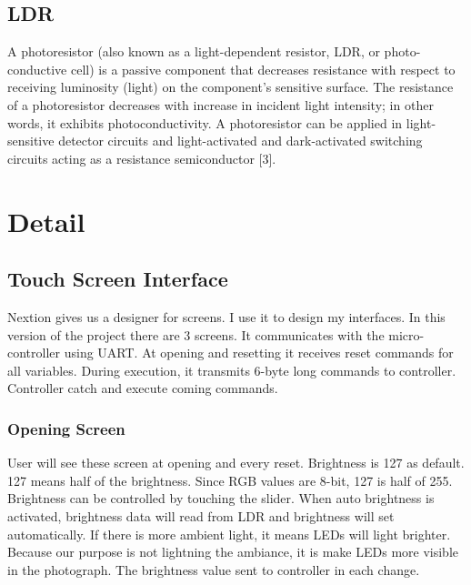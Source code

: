 \documentclass[conference]{IEEEtran}
\begin{document}
\subsection{LDR}
A photoresistor (also known as a light-dependent resistor, LDR, or photo-conductive cell) is a passive component that decreases resistance with respect to receiving luminosity (light) on the component's sensitive surface. The resistance of a photoresistor decreases with increase in incident light intensity; in other words, it exhibits photoconductivity. A photoresistor can be applied in light-sensitive detector circuits and light-activated and dark-activated switching circuits acting as a resistance semiconductor [3]. \\

\section{Detail}

\subsection{Touch Screen Interface}
Nextion gives us a designer for screens. I use it to design my interfaces. In this version of the project there are 3 screens. It communicates with the micro-controller using UART. At opening and resetting it receives reset commands for all variables. During execution, it transmits 6-byte long commands to controller. Controller catch and execute coming commands.

\subsubsection{Opening Screen}
User will see these screen at opening and every reset. Brightness is 127 as default. 127 means half of the brightness. Since RGB values are 8-bit, 127 is half of 255. Brightness can be controlled by touching the slider. When auto brightness is activated, brightness data will read from LDR and brightness will set automatically. If there is more ambient light, it means LEDs will light brighter. Because our purpose is not lightning the ambiance, it is make LEDs more visible in the photograph. The brightness value sent to controller in each change. \\
\end{document}
